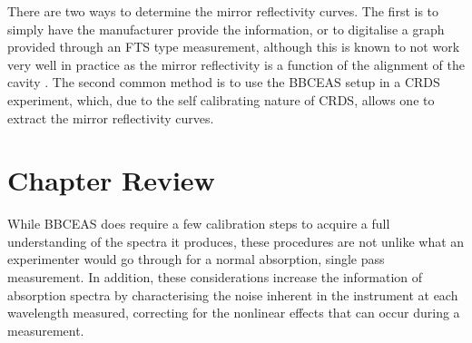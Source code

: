 There are two ways to determine the mirror reflectivity curves. The first is
to simply have the manufacturer provide the information, or to digitalise a
graph provided through an \ac{FTS} type measurement, although this is known to
not work very well in practice as the mirror reflectivity is a function of the
alignment of the cavity \cite{Berden:2009wk}. The second common method is to
use the \ac{BBCEAS} setup in a \ac{CRDS} experiment, which, due to the self
calibrating nature of \ac{CRDS}, allows one to extract the mirror reflectivity
curves.



\section*{Chapter Review}

While \ac{BBCEAS} does require a few calibration steps to acquire a full
understanding of the spectra it produces, these procedures are not unlike what
an experimenter would go through for a normal absorption, single pass
measurement. In addition, these considerations increase the information of
absorption spectra by characterising the noise inherent in the instrument at
each wavelength measured, correcting for the nonlinear
effects that can occur during a measurement.
